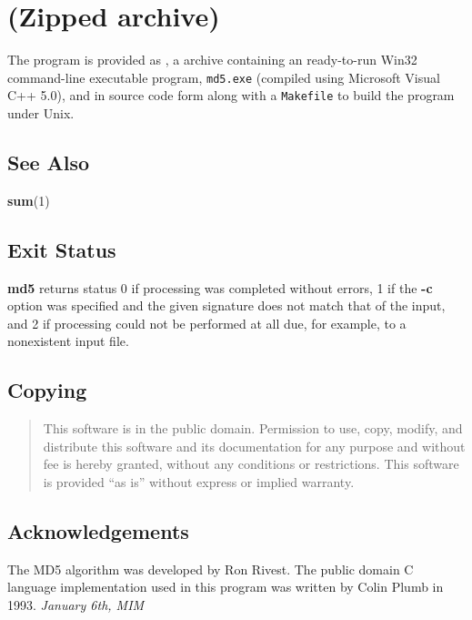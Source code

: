 \section{
 (Zipped
archive)}

The program is provided as 
, a 
 archive containing an ready-to-run
Win32 command-line executable program, {\tt md5.exe} (compiled using Microsoft
Visual C++ 5.0), and in source code form along with a {\tt Makefile} to build
the program under Unix. 

\subsection{See Also}

{\bf sum}(1) 

\subsection{Exit Status}

{\bf md5} returns status 0 if processing was completed without errors, 1 if
the {\bf -c} option was specified and the given signature does not match that
of the input, and 2 if processing could not be performed at all due, for
example, to a nonexistent input file. 

\subsection{Copying}

\begin{quote}
This software is in the public domain. Permission to use, copy,  modify, and
distribute this software and its documentation for any purpose and  without
fee is hereby granted, without any conditions or restrictions. This  software
is provided ``as is'' without express or implied warranty. 
\end{quote}

\subsection{Acknowledgements}

The MD5 algorithm was developed by Ron Rivest. The public domain C language
implementation used in this program was written by Colin Plumb in 1993. 
{\it 
{}
January 6th, MIM } 
